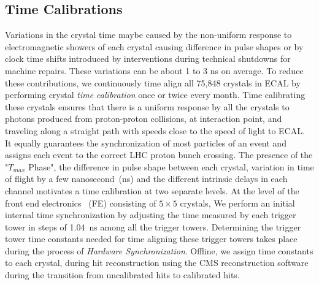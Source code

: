 \subsection{Time Calibrations}
Variations in the crystal time maybe caused by the non-uniform response to electromagnetic showers of each crystal causing difference in pulse shapes or by clock time shifts introduced by interventions during technical shutdowns for machine repairs. These variations can be about 1 to 3 ns on average. To reduce these contributions, we continuously time align all 75,848 \pb crystals in ECAL by performing crystal \textit{time calibration} once or twice every month. 
Time calibrating these crystals ensures that there is a uniform response by all the crystals to photons produced from proton-proton collisions, at interaction point, and traveling along a straight path with speeds close to the speed of light to ECAL. It equally guarantees the synchronization of most particles of an event and assigns each event to the correct LHC proton bunch crossing. 
\newline
The presence of the "$T_{max}$ Phase", the difference in pulse shape between each crystal, variation in time of flight by a few nanosecond~(ns) and the different intrinsic delays in each channel motivates a time calibration at two separate levels. At the level of the front end electronics ~(FE) consisting of $5\times5$ crystals, We perform an initial internal time synchronization by adjusting the time measured by each trigger tower in steps of 1.04~ns among all the trigger towers. Determining the trigger tower time constants needed for time aligning these trigger towers takes place during the process of \textit{Hardware Synchronization}. Offline, we assign time constants to each crystal, during hit reconstruction using the CMS reconstruction software during the transition from uncalibrated hits to calibrated hits.
 

